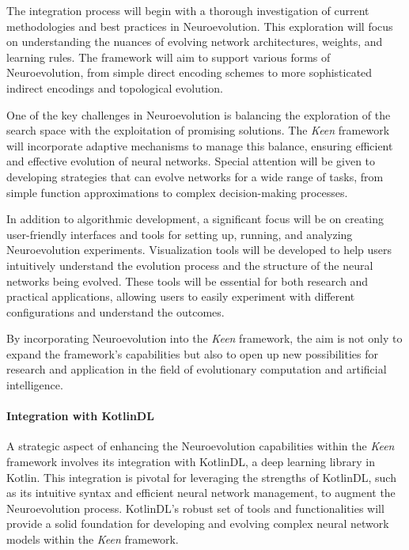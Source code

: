         The integration process will begin with a thorough investigation of current methodologies and best practices in 
        Neuroevolution. This exploration will focus on understanding the nuances of evolving network architectures, 
        weights, and learning rules. The framework will aim to support various forms of Neuroevolution, from simple 
        direct encoding schemes to more sophisticated indirect encodings and topological evolution. 

        One of the key challenges in Neuroevolution is balancing the exploration of the search space with the 
        exploitation of promising solutions. The \textit{Keen} framework will incorporate adaptive mechanisms to manage 
        this balance, ensuring efficient and effective evolution of neural networks. Special attention will be given to 
        developing strategies that can evolve networks for a wide range of tasks, from simple function approximations to 
        complex decision-making processes.

        In addition to algorithmic development, a significant focus will be on creating user-friendly interfaces and 
        tools for setting up, running, and analyzing Neuroevolution experiments. Visualization tools will be developed 
        to help users intuitively understand the evolution process and the structure of the neural networks being 
        evolved. These tools will be essential for both research and practical applications, allowing users to easily 
        experiment with different configurations and understand the outcomes.

        By incorporating Neuroevolution into the \textit{Keen} framework, the aim is not only to expand the framework's 
        capabilities but also to open up new possibilities for research and application in the field of evolutionary 
        computation and artificial intelligence.

        \paragraph{Integration with KotlinDL}
            A strategic aspect of enhancing the Neuroevolution capabilities within the \textit{Keen} framework involves 
            its integration with KotlinDL, a deep learning library in Kotlin. This integration is pivotal for leveraging 
            the strengths of KotlinDL, such as its intuitive syntax and efficient neural network management, to augment 
            the Neuroevolution process. KotlinDL's robust set of tools and functionalities will provide a solid 
            foundation for developing and evolving complex neural network models within the \textit{Keen} framework.

